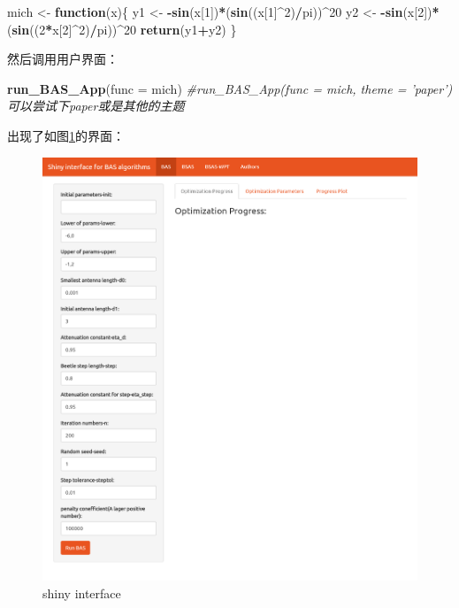 \documentclass[]{ctexbook}
\newenvironment{Shaded}{\begin{snugshade}}{\end{snugshade}}
\newcommand{\KeywordTok}[1]{\textcolor[rgb]{0.13,0.29,0.53}{\textbf{#1}}}
\newcommand{\DataTypeTok}[1]{\textcolor[rgb]{0.13,0.29,0.53}{#1}}
\newcommand{\DecValTok}[1]{\textcolor[rgb]{0.00,0.00,0.81}{#1}}
\newcommand{\StringTok}[1]{\textcolor[rgb]{0.31,0.60,0.02}{#1}}
\newcommand{\CommentTok}[1]{\textcolor[rgb]{0.56,0.35,0.01}{\textit{#1}}}
\newcommand{\ControlFlowTok}[1]{\textcolor[rgb]{0.13,0.29,0.53}{\textbf{#1}}}
\newcommand{\OperatorTok}[1]{\textcolor[rgb]{0.81,0.36,0.00}{\textbf{#1}}}
\newcommand{\NormalTok}[1]{#1}
\begin{document}
\begin{Shaded}
\begin{Highlighting}[]
\NormalTok{mich <-}\StringTok{ }\ControlFlowTok{function}\NormalTok{(x)\{}
\NormalTok{  y1 <-}\StringTok{ }\OperatorTok{-}\KeywordTok{sin}\NormalTok{(x[}\DecValTok{1}\NormalTok{])}\OperatorTok{*}\NormalTok{(}\KeywordTok{sin}\NormalTok{((x[}\DecValTok{1}\NormalTok{]}\OperatorTok{^}\DecValTok{2}\NormalTok{)}\OperatorTok{/}\NormalTok{pi))}\OperatorTok{^}\DecValTok{20}
\NormalTok{  y2 <-}\StringTok{ }\OperatorTok{-}\KeywordTok{sin}\NormalTok{(x[}\DecValTok{2}\NormalTok{])}\OperatorTok{*}\NormalTok{(}\KeywordTok{sin}\NormalTok{((}\DecValTok{2}\OperatorTok{*}\NormalTok{x[}\DecValTok{2}\NormalTok{]}\OperatorTok{^}\DecValTok{2}\NormalTok{)}\OperatorTok{/}\NormalTok{pi))}\OperatorTok{^}\DecValTok{20}
  \KeywordTok{return}\NormalTok{(y1}\OperatorTok{+}\NormalTok{y2)}
\NormalTok{\}}
\end{Highlighting}
\end{Shaded}

然后调用用户界面：

\begin{Shaded}
\begin{Highlighting}[]
\KeywordTok{run_BAS_App}\NormalTok{(}\DataTypeTok{func =}\NormalTok{ mich)}
\CommentTok{#run_BAS_App(func = mich, theme = 'paper') 可以尝试下paper或是其他的主题}
\end{Highlighting}
\end{Shaded}

出现了如图\ref{fig:basapp}的界面：

\begin{figure}

{\centering \includegraphics[width=0.95\linewidth]{img/app1} 

}

\caption{shiny interface}\label{fig:basapp}
\end{figure}
\end{document}
